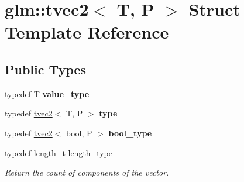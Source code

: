 \hypertarget{structglm_1_1tvec2}{}\section{glm\+:\+:tvec2$<$ T, P $>$ Struct Template Reference}
\label{structglm_1_1tvec2}
\subsection*{Public Types}
\begin{DoxyCompactItemize}
\item 
\mbox{\label{structglm_1_1tvec2_a45de6851b3de40183d7e35deb7cb27ab}} 
typedef T {\bfseries value\+\_\+type}
\item 
\mbox{\label{structglm_1_1tvec2_a387f2c68c61e26e75bbe3d67ee878f41}} 
typedef \hyperlink{structglm_1_1tvec2}{tvec2}$<$ T, P $>$ {\bfseries type}
\item 
\mbox{\label{structglm_1_1tvec2_add34b9138a842221f63186e25378d92e}} 
typedef \hyperlink{structglm_1_1tvec2}{tvec2}$<$ bool, P $>$ {\bfseries bool\+\_\+type}
\item 
\mbox{\label{structglm_1_1tvec2_a5a5ddebab821a3cf9185772386afbe8d}} 
typedef length\+\_\+t \hyperlink{structglm_1_1tvec2_a5a5ddebab821a3cf9185772386afbe8d}{length\+\_\+type}
\begin{DoxyCompactList}\small\item\em Return the count of components of the vector. \end{DoxyCompactList}\end{DoxyCompactItemize}
